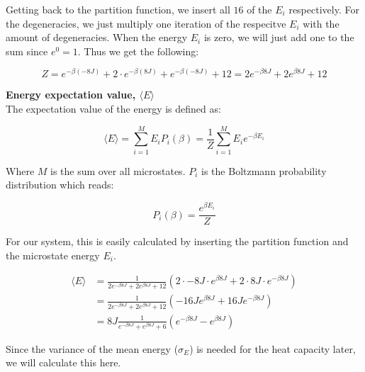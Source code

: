 \documentclass[../main.tex]{subfiles}
\begin{document}
    Getting back to the partition function, we insert all $16$ of the $E_i$ respectively. For the degeneracies, we just multiply one iteration of the respecitve $E_i$ with the amount of degeneracies. When the energy $E_i$ is zero, we will just add one to the sum since $e^0 = 1$. Thus we get the following:

    \[Z = e^{-\beta (-8J)} + 2 \cdot e^{-\beta (8J)} + e^{-\beta (-8J)} + 12 = 2e^{-\beta 8J} + 2e^{\beta 8J} + 12\]

    \textbf{Energy expectation value, $\langle E \rangle$}\\
    The expectation value of the energy is defined as:

    \[\langle E \rangle = \sum_{i=1}^M E_i P_i(\beta) = \frac{1}{Z}\sum_{i=1}^M E_i e^{-\beta E_i}\]

    Where $M$ is the sum over all microstates. $P_i$ is the Boltzmann probability distribution which reads:

    \[P_i(\beta) = \frac{e^{\beta E_i}}{Z}\]

    For our system, this is easily calculated by inserting the partition function and the microstate energy $E_i$.

    \begin{align*}
      \langle E \rangle &= \frac{1}{2e^{-\beta 8J} + 2e^{\beta 8J} + 12} \left(2 \cdot -8J \cdot e^{\beta 8J} + 2\cdot 8J \cdot e^{-\beta8J}\right)\\
        &= \frac{1}{2e^{-\beta 8J} + 2e^{\beta 8J} + 12} \left(-16J e^{\beta8J} + 16Je^{-\beta 8J}\right)\\
        &= 8J \frac{1}{e^{-\beta 8J} + e^{\beta 8J} + 6}  \left(e^{-\beta8J} - e^{\beta 8J}\right)
    \end{align*}

    Since the variance of the mean energy ($\sigma_E$) is needed for the heat capacity later, we will calculate this here.
\end{document}
